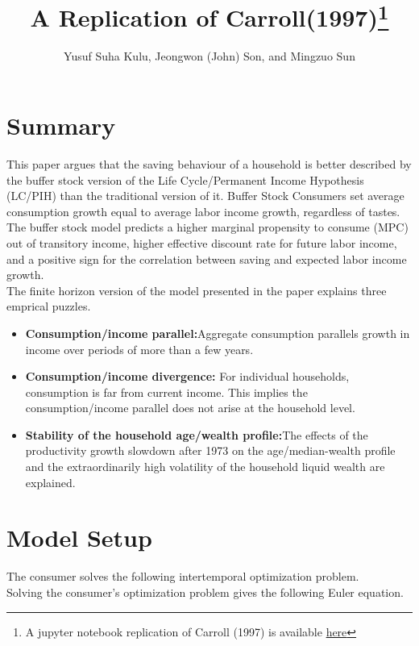 \documentclass[]{article}
\title{A Replication of Carroll(1997)\protect\footnote{A jupyter notebook replication of Carroll (1997) is available \href{https://github.com/sonjeongwon621/REMARK/blob/master/REMARKs/Carroll_1997/Carroll_1997_RemARK.ipynb}{here}}}
\author{Yusuf Suha Kulu, Jeongwon (John) Son, and Mingzuo Sun}
\date{}
\providecommand{\EqDir}{Equations}
\begin{document}
\setlength\parindent{0pt}

\maketitle

\section{Summary}

This paper argues that the saving behaviour of a household is better described by the buffer stock version of the Life Cycle/Permanent Income Hypothesis (LC/PIH) than the traditional version of it. Buffer Stock Consumers set average consumption growth equal to average labor income growth, regardless of tastes. The buffer stock model predicts a higher marginal propensity to consume (MPC) out of transitory income, higher effective discount rate for future labor income, and a positive sign for the correlation between saving and expected labor income growth.\\

The finite horizon version of the model presented in the paper explains three emprical puzzles.
\begin{itemize}
\item \textbf{Consumption/income parallel:}Aggregate consumption parallels growth in income over periods of more than a few years.
\item \textbf{Consumption/income divergence:} For individual households, consumption is far from current income. This implies the consumption/income parallel does not arise at the household level.
\item \textbf{Stability of the household age/wealth profile:}The effects of the productivity growth slowdown after 1973 on the age/median-wealth profile and the extraordinarily high volatility of the household liquid wealth are explained. 
\end{itemize}

\newpage 

\section{Model Setup}

The consumer solves the following intertemporal optimization problem.\\


Solving the consumer's optimization problem gives the following Euler equation.\\

\end{document}
